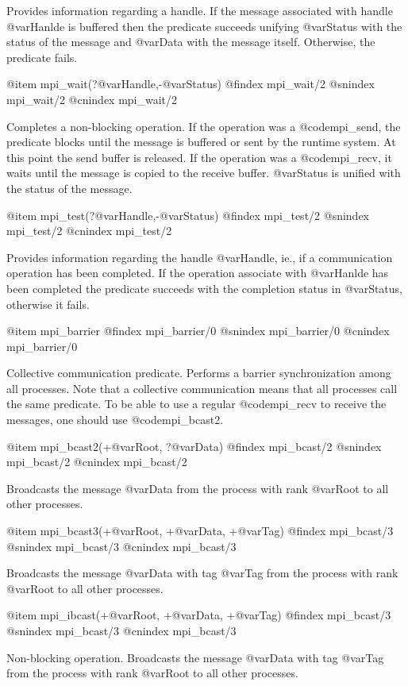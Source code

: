 {{{{{{{{{Provides information regarding a handle. If the message associated
with handle @var{Hanlde} is buffered then the predicate succeeds
unifying @var{Status} with the status of the message and @var{Data}
with the message itself. Otherwise, the predicate fails.


@item mpi_wait(?@var{Handle},-@var{Status})
@findex mpi_wait/2
@snindex mpi_wait/2
@cnindex mpi_wait/2

Completes a non-blocking operation. If the operation was a
@code{mpi_send}, the predicate blocks until the message is buffered
or sent by the runtime system. At this point the send buffer is
released. If the operation was a @code{mpi_recv}, it waits until the
message is copied to the receive buffer. @var{Status} is unified with
the status of the message.

@item mpi_test(?@var{Handle},-@var{Status})
@findex mpi_test/2
@snindex mpi_test/2
@cnindex mpi_test/2

Provides information regarding the handle @var{Handle}, ie., if a
communication operation has been completed.  If the operation
associate with @var{Hanlde} has been completed the predicate succeeds
with the completion status in @var{Status}, otherwise it fails.

@item mpi_barrier
@findex mpi_barrier/0
@snindex mpi_barrier/0
@cnindex mpi_barrier/0

Collective communication predicate.  Performs a barrier
synchronization among all processes. Note that a collective
communication means that all processes call the same predicate. To be
able to use a regular @code{mpi_recv} to receive the messages, one
should use @code{mpi_bcast2}.


@item mpi_bcast2(+@var{Root}, ?@var{Data})
@findex mpi_bcast/2
@snindex mpi_bcast/2
@cnindex mpi_bcast/2

Broadcasts the message @var{Data} from the process with rank @var{Root}
to all other processes.

@item mpi_bcast3(+@var{Root}, +@var{Data}, +@var{Tag})
@findex mpi_bcast/3
@snindex mpi_bcast/3
@cnindex mpi_bcast/3

Broadcasts the message @var{Data} with tag @var{Tag} from the process with rank @var{Root}
to all other processes.

@item mpi_ibcast(+@var{Root}, +@var{Data}, +@var{Tag})
@findex mpi_bcast/3
@snindex mpi_bcast/3
@cnindex mpi_bcast/3

Non-blocking operation. Broadcasts the message @var{Data} with tag @var{Tag}
from the process with rank @var{Root} to all other processes.

}}}}}}}}}
